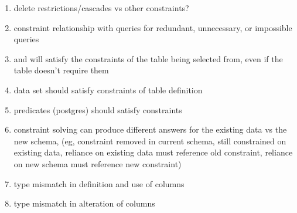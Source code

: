 \documentclass[12pt]{article}
\begin{document}
\begin{enumerate}
  \item delete restrictions/cascades vs other constraints?
  \item constraint relationship with queries for redundant, unnecessary, or impossible queries
  \item {} and  will satisfy the constraints of the table being selected from, even if the table doesn't require them
  \item {} data set should satisfy constraints of table definition
  \item {} predicates (postgres) should satisfy constraints
  \item constraint solving can produce different answers for the existing data vs the new schema, (eg, constraint removed in current schema, still constrained on existing data, reliance on existing data must reference old constraint, reliance on new schema must reference new constraint)
  \item type mismatch in definition and use of columns
  \item type mismatch in alteration of columns
\end{enumerate}

\newpage



\end{document}

